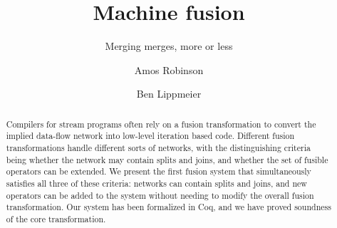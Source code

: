 \documentclass[acmlarge,review]{acmart}\settopmatter{printfolios=true}
\begin{document}
\title{Machine fusion}
\subtitle{Merging merges, more or less}

\author{Amos Robinson}

\author{Ben Lippmeier}

\makeatactive
\begin{abstract}
Compilers for stream programs often rely on a fusion transformation to convert the implied data-flow network into low-level iteration based code. Different fusion transformations handle different sorts of networks, with the distinguishing criteria being whether the network may contain splits and joins, and whether the set of fusible operators can be extended. We present the first fusion system that simultaneously satisfies all three of these criteria: networks can contain splits and joins, and new operators can be added to the system without needing to modify the overall fusion transformation. Our system has been formalized in Coq, and we have proved soundness of the core transformation.
\end{abstract}


\maketitle











\clearpage{}

\end{document}
